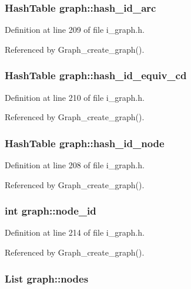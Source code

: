 \subsubsection{\setlength{\rightskip}{0pt plus 5cm}\bf{Hash\-Table} \bf{graph::hash\_\-id\_\-arc}}\label{structgraph_2702ca5a3bd652ab6a8d29e12276a453}




Definition at line 209 of file i\_\-graph.h.

Referenced by Graph\_\-create\_\-graph().
\subsubsection{\setlength{\rightskip}{0pt plus 5cm}\bf{Hash\-Table} \bf{graph::hash\_\-id\_\-equiv\_\-cd}}\label{structgraph_ab3a49eb4d13a1e547849e1b686a9c50}




Definition at line 210 of file i\_\-graph.h.

Referenced by Graph\_\-create\_\-graph().
\subsubsection{\setlength{\rightskip}{0pt plus 5cm}\bf{Hash\-Table} \bf{graph::hash\_\-id\_\-node}}\label{structgraph_99fefc38907d38734769241e805b9a00}




Definition at line 208 of file i\_\-graph.h.

Referenced by Graph\_\-create\_\-graph().
\subsubsection{\setlength{\rightskip}{0pt plus 5cm}int \bf{graph::node\_\-id}}\label{structgraph_fa9642e846c9311409e11fb2affd7a08}




Definition at line 214 of file i\_\-graph.h.

Referenced by Graph\_\-create\_\-graph().
\subsubsection{\setlength{\rightskip}{0pt plus 5cm}\bf{List} \bf{graph::nodes}}\label{structgraph_c2de38bed890a7e612dabb3068ed4cac}




